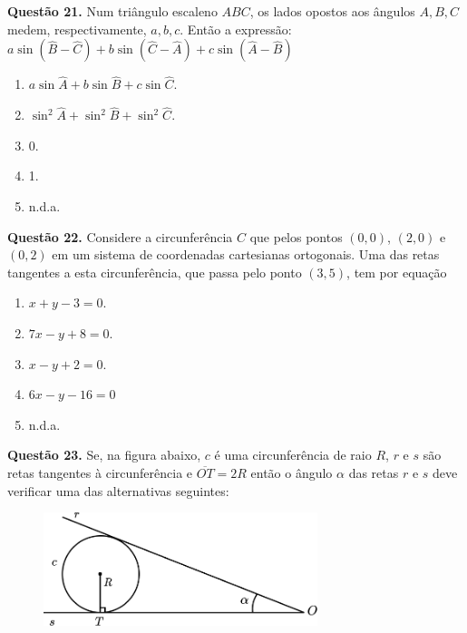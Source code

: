 \documentclass[11pt]{article}
\begin{document}
\newpage

\textbf{Questão 21.} Num triângulo escaleno $ABC$, os lados opostos aos ângulos $A, B, C$ medem, respectivamente, $a, b ,c$. Então a expressão: $a \sin(\hat{B} - \hat{C}) + b \sin(\hat{C} - \hat{A}) +  c \sin(\hat{A} - \hat{B})$


\begin{multicols}{3}
    \begin{enumerate}[\bf A (\quad)]
        \item $a\sin\hat{A}+b\sin\hat{B}+c\sin\hat{C}$.
        \item $\sin^2\hat{A}+\sin^2\hat{B}+\sin^2\hat{C}$.
        \item 0.
        \item 1.
        \item n.d.a.
    \end{enumerate}
\end{multicols}

\textbf{Questão 22.} Considere a circunferência $C$ que pelos pontos $(0,0)$, $(2,0)$ e $(0,2)$ em um sistema de coordenadas cartesianas ortogonais. Uma das retas tangentes a esta circunferência, que passa pelo ponto $(3,5)$, tem por equação

\begin{multicols}{3}
\begin{enumerate}[\bf A (\quad)]
    \item $x + y - 3 = 0$.
    \item $7x - y + 8 = 0$.
    \item $x - y + 2 = 0$.
    \item $6x - y - 16 = 0$
    \item n.d.a.
\end{enumerate}
\end{multicols}

\textbf{Questão 23.} Se, na figura abaixo, $c$ é uma circunferência de raio $R$, $r$ e $s$ são retas tangentes à circunferência e $\overline{OT} = 2R$ então o ângulo $\alpha$ das retas $r$ e $s$ deve verificar uma das alternativas seguintes:

\begin{figure}[h]
    \includegraphics[width=8cm]{./imgs/figure_ita_1975_matematica_q23.png}
    \centering
\end{figure}
\end{document}
